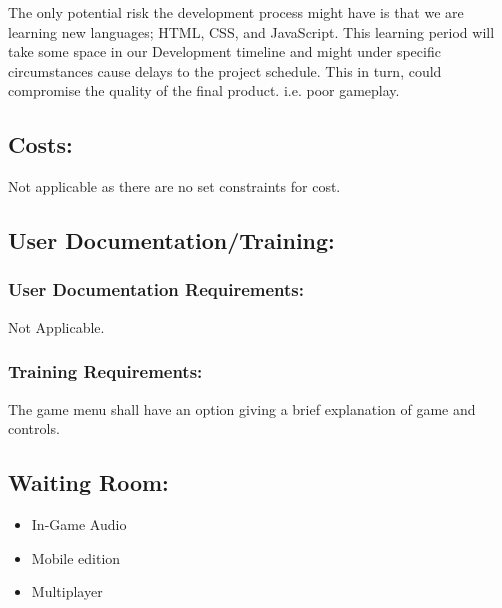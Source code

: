 \documentclass{article}
\begin{document}
The only potential risk the development process might have is that we are
learning new languages; HTML, CSS, and JavaScript. This learning period will
take some space in our Development timeline and might under specific
circumstances cause delays to the project schedule. This in turn, could
compromise the quality of the final product. i.e. poor gameplay.

\subsection{Costs:}
Not applicable as there are no set constraints for cost.
\subsection{User Documentation/Training:}
\subsubsection{User Documentation Requirements:}
Not Applicable.
\subsubsection{Training Requirements:}
The game menu shall have an option giving a brief explanation of game and 
controls. 
\subsection{Waiting Room:}
\begin{itemize}
\item In-Game Audio
\item Mobile edition
\item Multiplayer
\end{itemize}
\end{document}
